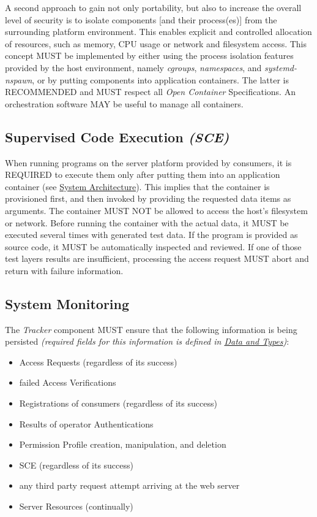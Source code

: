 \documentclass[12pt,english,a4paper,titlepage,cleardoublepage=empty,dottedtoc]{report}
\providecommand{\tightlist}{%
  \setlength{\itemsep}{0pt}\setlength{\parskip}{0pt}}
\begin{document}
A second approach to gain not only portability, but also to increase the
overall level of security is to isolate components {[}and their
process(es){]} from the surrounding platform environment. This enables
explicit and controlled allocation of resources, such as memory, CPU
usage or network and filesystem access. This concept MUST be implemented
by either using the process isolation features provided by the host
environment, namely \emph{cgroups}, \emph{namespaces}, and
\emph{systemd-nspawn}, or by putting components into application
containers. The latter is RECOMMENDED and MUST respect all \emph{Open
Container} Specifications. An orchestration software MAY be useful to
manage all containers.

\subsection{\texorpdfstring{Supervised Code Execution
\emph{(SCE)}}{Supervised Code Execution (SCE)}}\label{supervised-code-execution-sce}

When running programs on the server platform provided by consumers, it
is REQUIRED to execute them only after putting them into an application
container (see \protect\hyperlink{system-architecture}{System
Architecture}). This implies that the container is provisioned first,
and then invoked by providing the requested data items as arguments. The
container MUST NOT be allowed to access the host's filesystem or
network. Before running the container with the actual data, it MUST be
executed several times with generated test data. If the program is
provided as source code, it MUST be automatically inspected and
reviewed. If one of those test layers results are insufficient,
processing the access request MUST abort and return with failure
information.

\subsection{System Monitoring}\label{system-monitoring}

The \emph{Tracker} component MUST ensure that the following information
is being persisted \emph{(required fields for this information is
defined in \protect\hyperlink{data-and-types}{Data and Types})}:

\begin{itemize}
\tightlist
\item
  Access Requests (regardless of its success)
\item
  failed Access Verifications
\item
  Registrations of consumers (regardless of its success)
\item
  Results of operator Authentications
\item
  Permission Profile creation, manipulation, and deletion
\item
  SCE (regardless of its success)
\item
  any third party request attempt arriving at the web server
\item
  Server Resources (continually)
\end{itemize}
\end{document}
